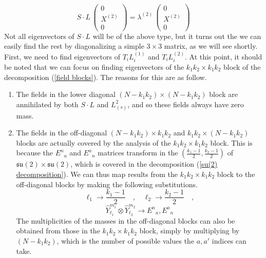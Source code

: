%
%
\begin{equation}\label{stacked eigenvectors}
S \cdot L \, \left( \begin{array}{c}
0 \\
X^{(2)} \\
0
\end{array} \right)
=
\lambda^{(2)} \, \left( \begin{array}{c}
0 \\
X^{(2)} \\
0
\end{array} \right)
\end{equation}
%
%
Not all eigenvectors of $S \cdot L$ will be of the above type, but it turns out the we can easily find the rest by diagonalizing a simple $3 \times 3$ matrix, as we will see shortly. First, we need to find eigenvectors of $T_i L_i^{(1)}$ and $T_i L_i^{(2)}$. At this point, it should be noted that we can focus on finding eigenvectors of the $k_1 k_2 \times k_1 k_2$ block of the decomposition (\ref{field blocks}). The reasons for this are as follow.
%
%
\begin{enumerate}
%
\item The fields in the lower diagonal $(N - k_1 k_2) \times (N - k_1 k_2)$ block are annihilated by both $S \cdot L$ and $L_{(s)}^2$, and so these fields always have zero mass.
%
\item The fields in the off-diagonal $(N - k_1 k_2) \times k_1 k_2$ and $k_1 k_2 \times (N - k_1 k_2)$ blocks are actually covered by the analysis of the $k_1 k_2 \times k_1 k_2$ block. This is because the ${E^n}_a$ and ${E^a}_n$ matrices transform in the $(\frac{k_1-1}{2}, \frac{k_2-1}{2})$ of $\mathfrak{su}(2) \times \mathfrak{su}(2)$, which is covered in the decomposition (\ref{su(2) decomposition}). We can thus map results from the $k_1 k_2 \times k_1 k_2$ block to the off-diagonal blocks by making the following substitutions.
%
%
\begin{equation*}
\ell_1 \to \frac{k_1 - 1}{2}
%
\quad , \quad
%
\ell_2 \to \frac{k_2 - 1}{2}
%
\quad ,
\end{equation*}
%
%
\begin{equation}\label{k1k1 block to off diagonal}
\hat{Y}^{m_1}_{\ell_1} \otimes \hat{Y}^{m_2}_{\ell_2}
\to
{E^n}_a, {E^a}_n
\end{equation}
%
%
The multiplicities of the masses in the off-diagonal blocks can also be obtained from those in the $k_1 k_2 \times k_1 k_2$ block, simply by multiplying by $(N - k_1 k_2)$, which is the number of possible values the $a,a'$ indices can take.
%
\end{enumerate}
